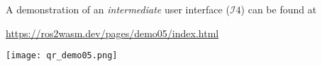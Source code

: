         \begin{tcolorbox}[title=Example 8]
            \begin{minipage}[t]{0.87\linewidth}
                \vspace*{0.5\baselineskip}
                A demonstration of an \textit{intermediate} user interface ($\mathcal{I}4$) can be found at 
                
                \href{https://ros2wasm.dev/pages/demo05/index.html}{\textsf{https://ros2wasm.dev/pages/demo05/index.html}}
            \end{minipage}\hfill%
            \begin{minipage}[t]{0.1\linewidth}
                \vspace*{0pt}
                \texttt{[image: qr\_demo05.png]}
            \end{minipage}
        \end{tcolorbox}


    
